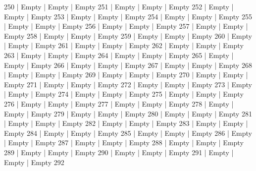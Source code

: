 250  | Empty  | Empty  | Empty
251  | Empty  | Empty  | Empty
252  | Empty  | Empty  | Empty
253  | Empty  | Empty  | Empty
254  | Empty  | Empty  | Empty
255  | Empty  | Empty  | Empty
256  | Empty  | Empty  | Empty
257  | Empty  | Empty  | Empty
258  | Empty  | Empty  | Empty
259  | Empty  | Empty  | Empty
260  | Empty  | Empty  | Empty
261  | Empty  | Empty  | Empty
262  | Empty  | Empty  | Empty
263  | Empty  | Empty  | Empty
264  | Empty  | Empty  | Empty
265  | Empty  | Empty  | Empty
266  | Empty  | Empty  | Empty
267  | Empty  | Empty  | Empty
268  | Empty  | Empty  | Empty
269  | Empty  | Empty  | Empty
270  | Empty  | Empty  | Empty
271  | Empty  | Empty  | Empty
272  | Empty  | Empty  | Empty
273  | Empty  | Empty  | Empty
274  | Empty  | Empty  | Empty
275  | Empty  | Empty  | Empty
276  | Empty  | Empty  | Empty
277  | Empty  | Empty  | Empty
278  | Empty  | Empty  | Empty
279  | Empty  | Empty  | Empty
280  | Empty  | Empty  | Empty
281  | Empty  | Empty  | Empty
282  | Empty  | Empty  | Empty
283  | Empty  | Empty  | Empty
284  | Empty  | Empty  | Empty
285  | Empty  | Empty  | Empty
286  | Empty  | Empty  | Empty
287  | Empty  | Empty  | Empty
288  | Empty  | Empty  | Empty
289  | Empty  | Empty  | Empty
290  | Empty  | Empty  | Empty
291  | Empty  | Empty  | Empty
292